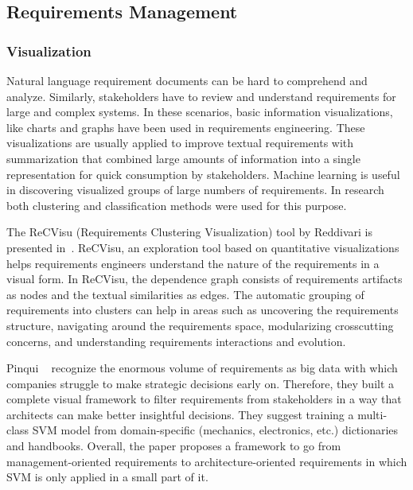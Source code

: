 \subsection{Requirements Management}

\subsubsection{Visualization}

Natural language requirement documents can be hard to comprehend and analyze. Similarly, stakeholders have to review and understand requirements for large and complex systems.  In these scenarios, basic information visualizations, like charts and graphs have been used in requirements engineering. These visualizations are usually applied to improve textual requirements with summarization that combined large amounts of information into a single representation for quick consumption by stakeholders\cite{Reddivari:2012}. Machine learning is useful in discovering visualized groups of large numbers of requirements. In research both clustering and classification methods were used for this purpose.

The ReCVisu (Requirements Clustering Visualization) tool by Reddivari
\etal is presented in~\cite{Reddivari:2012}. ReCVisu, an exploration tool based
on quantitative visualizations helps requirements engineers understand the nature
of the requirements in a visual form. In ReCVisu, the dependence graph consists
of requirements artifacts as nodes and the textual similarities as edges. The
automatic grouping of requirements into clusters can help in areas such as
uncovering the requirements structure, navigating around the requirements space,
modularizing crosscutting concerns, and understanding requirements interactions
and evolution.

Pinqui \etal~\cite{Pinqui:2015} recognize the enormous volume of requirements as
big data with which companies struggle to make strategic decisions early on.
Therefore, they built a complete visual framework to filter requirements from
stakeholders in a way that architects can make better insightful decisions. They
suggest training a multi-class SVM model from domain-specific (mechanics,
electronics, etc.) dictionaries and handbooks. Overall, the paper proposes a
framework to go from management-oriented requirements to architecture-oriented
requirements in which SVM is only applied in a small part of it.

